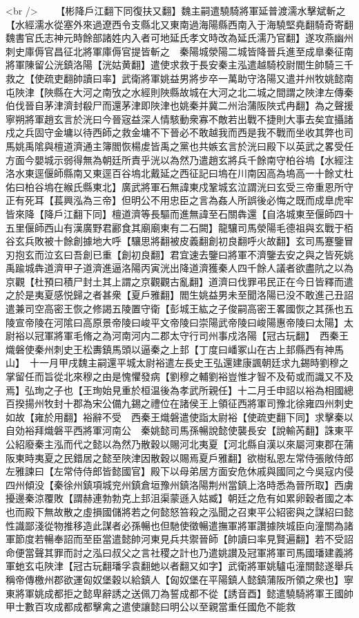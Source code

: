 <br />
　　【彬降戶江翻下同復扶又翻】魏主嗣遣驍騎將軍延普渡濡水擊斌斬之【水經濡水從塞外來過遼西令支縣北又東南過海陽縣西南入于海驍堅堯翻騎奇寄翻魏書官氏志神元時餘部諸姓内入者可地延氏孝文時改為延氏濡乃官翻】遂攻燕幽州刺史庫傉官昌征北將軍庫傉官提皆斬之　秦陽城滎陽二城皆降晉兵進至成臯秦征南將軍陳留公洸鎮洛陽【洸姑黄翻】遣使求救于長安秦主泓遣越騎校尉閻生帥騎三千救之【使疏吏翻帥讀曰率】武衛將軍姚益男將步卒一萬助守洛陽又遣并州牧姚懿南屯陜津【陜縣在大河之南攷之水經則陜縣故城在大河之北二城之間謂之陜津左傳秦伯伐晉自茅津濟封殽尸而還茅津即陜津也姚秦并冀二州治蒲阪陜式冉翻】為之聲援寧朔將軍趙玄言於洸曰今晉宼益深人情駭動衆寡不敵若出戰不捷則大事去矣宜攝諸戍之兵固守金墉以待西師之救金墉不下晉必不敢越我而西是我不戰而坐收其弊也司馬姚禹隂與檀道濟通主簿閻恢楊䖍皆禹之黨也共嫉玄言於洸曰殿下以英武之畧受任方面今嬰城示弱得無為朝廷所責乎洸以為然乃遣趙玄將兵千餘南守柏谷塢【水經注洛水東逕偃師縣南又東逕百谷塢北戴延之西征記曰塢在川南因高為塢高一十餘丈杜佑曰柏谷塢在緱氏縣東北】廣武將軍石無諱東戍鞏城玄泣謂洸曰玄受三帝重恩所守正有死耳【萇興泓為三帝】但明公不用忠臣之言為姦人所誤後必悔之既而成臯虎牢皆來降【降戶江翻下同】檀道濟等長驅而進無諱至石關犇還【自洛城東至偃師四十五里偃師西山有漢廣野君酈食其廟廟東有二石闕】龍驤司馬滎陽毛德祖與玄戰于栢谷玄兵敗被十餘創據地大呼【驤思將翻被皮義翻創初良翻呼火故翻】玄司馬蹇鑒冒刃抱玄而泣玄曰吾創已重【創初良翻】君宜速去鑒曰將軍不濟鑒去安之與之皆死姚禹踰城犇道濟甲子道濟進逼洛陽丙寅洸出降道濟獲秦人四千餘人議者欲盡阬之以為京觀【杜預曰積尸封土其上謂之京觀觀古亂翻】道濟曰伐罪弔民正在今日皆釋而遣之於是夷夏感悦歸之者甚衆【夏戶雅翻】閻生姚益男未至聞洛陽已没不敢進己丑詔遣兼司空高密王恢之修謁五陵置守衛【彭城王紘之子俊嗣高密王畧國恢之其孫也五陵宣帝陵在河隂曰高原景帝陵曰峻平文帝陵曰崇陽武帝陵曰峻陽惠帝陵曰太陽】太尉裕以冠軍將軍毛脩之為河南河内二郡太守行司州事戍洛陽【冠古玩翻】　西秦王熾磐使秦州刺史王松夀鎮馬頭以逼秦之上邽【丁度曰嶓冢山在古上邽縣西有神馬山】　十一月甲戌魏主嗣還平城太尉裕遣左長史王弘還建康諷朝廷求九錫時劉穆之掌留任而旨從北來穆之由是愧懼發病【劉穆之輔劉裕豈惟才智不及荀或而識又不及焉】弘珣之子也【王珣始見重於桓温後為孝武所親任】十二月壬申詔以裕為相國總百揆揚州牧封十郡為宋公備九錫之禮位在諸侯王上領征西將軍司豫北徐雍四州刺史如故【雍於用翻】裕辭不受　西秦王熾磐遣使詣太尉裕【使疏吏翻下同】求擊秦以自効裕拜熾磐平西將軍河南公　秦姚懿司馬孫暢說懿使襲長安【說輸芮翻】誅東平公紹廢秦主泓而代之懿以為然乃散穀以賜河北夷夏【河北縣自漢以來屬河東郡在蒲阪東時夷夏之民錯居之懿至陜津因散穀以賜焉夏戶雅翻】欲樹私恩左常侍張敞侍郎左雅諫曰【左常侍侍郎皆懿國官】殿下以母弟居方面安危休戚與國同之今吳寇内侵四州傾没【秦徐州鎮項城兖州鎮倉垣豫州鎮洛陽荆州當鎮上洛時悉為晉所取】西虜擾邊秦涼覆敗【謂赫連勃勃克上邽沮渠蒙遜入姑臧】朝廷之危有如累卵穀者國之本也而殿下無故散之虛損國儲將若之何懿怒笞殺之泓聞之召東平公紹密與之謀紹曰懿性識鄙淺從物推移造此謀者必孫暢也但馳使徵暢遣撫軍將軍讚據陜城臣向潼關為諸軍節度若暢奉詔而至臣當遣懿帥河東見兵共禦晉師【帥讀曰率見賢遍翻】若不受詔命便當聲其罪而討之泓曰叔父之言社稷之計也乃遣姚讃及冠軍將軍司馬國璠建義將軍虵玄屯陜津【冠古玩翻璠孚袁翻虵以者翻又如字】武衛將軍姚驢屯潼關懿遂舉兵稱帝傳檄州郡欲運匈奴堡穀以給鎮人【匈奴堡在平陽鎮人懿鎮蒲阪所領之衆也】寧東將軍姚成都拒之懿卑辭誘之送佩刀為誓成都不從【誘音酉】懿遣驍騎將軍王國帥甲士數百攻成都成都擊禽之遣使讓懿曰明公以至親當重任國危不能救